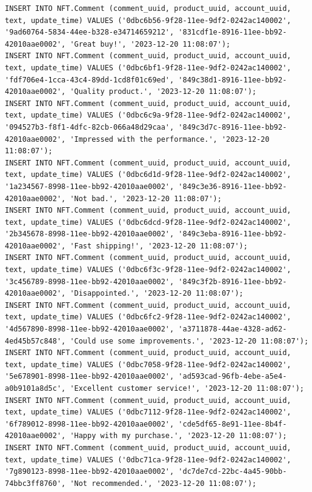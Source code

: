 \documentclass[a4paper, 12pt]{article}
\begin{document}
\begin{lstlisting}
INSERT INTO NFT.Comment (comment_uuid, product_uuid, account_uuid, text, update_time) VALUES ('0dbc6b56-9f28-11ee-9df2-0242ac140002', '9ad60764-5834-44ee-b328-e34714659212', '831cdf1e-8916-11ee-bb92-42010aae0002', 'Great buy!', '2023-12-20 11:08:07');
INSERT INTO NFT.Comment (comment_uuid, product_uuid, account_uuid, text, update_time) VALUES ('0dbc6bf1-9f28-11ee-9df2-0242ac140002', 'fdf706e4-1cca-43c4-89dd-1cd8f01c69ed', '849c38d1-8916-11ee-bb92-42010aae0002', 'Quality product.', '2023-12-20 11:08:07');
INSERT INTO NFT.Comment (comment_uuid, product_uuid, account_uuid, text, update_time) VALUES ('0dbc6c9a-9f28-11ee-9df2-0242ac140002', '094527b3-f8f1-4dfc-82cb-066a48d29caa', '849c3d7c-8916-11ee-bb92-42010aae0002', 'Impressed with the performance.', '2023-12-20 11:08:07');
INSERT INTO NFT.Comment (comment_uuid, product_uuid, account_uuid, text, update_time) VALUES ('0dbc6d1d-9f28-11ee-9df2-0242ac140002', '1a234567-8998-11ee-bb92-42010aae0002', '849c3e36-8916-11ee-bb92-42010aae0002', 'Not bad.', '2023-12-20 11:08:07');
INSERT INTO NFT.Comment (comment_uuid, product_uuid, account_uuid, text, update_time) VALUES ('0dbc6dcd-9f28-11ee-9df2-0242ac140002', '2b345678-8998-11ee-bb92-42010aae0002', '849c3eba-8916-11ee-bb92-42010aae0002', 'Fast shipping!', '2023-12-20 11:08:07');
INSERT INTO NFT.Comment (comment_uuid, product_uuid, account_uuid, text, update_time) VALUES ('0dbc6f3c-9f28-11ee-9df2-0242ac140002', '3c456789-8998-11ee-bb92-42010aae0002', '849c3f2b-8916-11ee-bb92-42010aae0002', 'Disappointed.', '2023-12-20 11:08:07');
INSERT INTO NFT.Comment (comment_uuid, product_uuid, account_uuid, text, update_time) VALUES ('0dbc6fc2-9f28-11ee-9df2-0242ac140002', '4d567890-8998-11ee-bb92-42010aae0002', 'a3711878-44ae-4328-ad62-4ed45b57c848', 'Could use some improvements.', '2023-12-20 11:08:07');
INSERT INTO NFT.Comment (comment_uuid, product_uuid, account_uuid, text, update_time) VALUES ('0dbc7058-9f28-11ee-9df2-0242ac140002', '5e678901-8998-11ee-bb92-42010aae0002', 'ad593cad-96fb-4ebe-a5e4-a0b9101a8d5c', 'Excellent customer service!', '2023-12-20 11:08:07');
INSERT INTO NFT.Comment (comment_uuid, product_uuid, account_uuid, text, update_time) VALUES ('0dbc7112-9f28-11ee-9df2-0242ac140002', '6f789012-8998-11ee-bb92-42010aae0002', 'cde5df65-8e91-11ee-8b4f-42010aae0002', 'Happy with my purchase.', '2023-12-20 11:08:07');
INSERT INTO NFT.Comment (comment_uuid, product_uuid, account_uuid, text, update_time) VALUES ('0dbc71ca-9f28-11ee-9df2-0242ac140002', '7g890123-8998-11ee-bb92-42010aae0002', 'dc7de7cd-22bc-4a45-90bb-74bbc3ff8760', 'Not recommended.', '2023-12-20 11:08:07');

\end{lstlisting}
\end{document}
